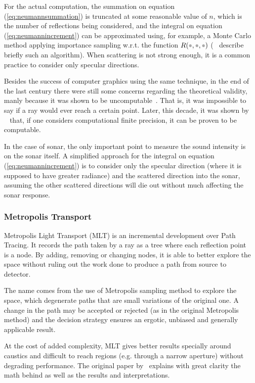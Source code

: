 For the actual computation, the summation on equation (\ref{eq:neumannsummation})
is truncated at some reasonable value of $n$, which is the number of
reflections being considered, and the integral on equation
(\ref{eq:neumannincrement}) can be approximated using, for example, a Monte Carlo
method applying importance sampling w.r.t. the function $R(\parm,\parm,\parm)$
(~\citet{munjal2013formulas} describe briefly such an algorithm).
When scattering is not strong enough, it is a common practice to consider only
specular directions. 

Besides the success of computer graphics using the same technique, in the end of
the last century there were still some concerns regarding the theoretical
validity, manly because it was shown to be
uncomputable~\cite{reif1994computability}. That is, it was impossible to say if
a ray would ever reach a certain point. Later, this decade, it was shown by
~\citet{blakey2014ray} that, if one considers computational finite precision, it
can be proven to be computable.

In the case of sonar, the only important point to measure the sound intensity is
on the sonar itself. A simplified approach for the integral on equation
(\ref{eq:neumannincrement}) is to consider only the specular direction (where it
is supposed to have greater radiance) and the scattered direction into the
sonar, assuming the other scattered directions will die out without much
affecting the sonar response.


\subsubsection{Metropolis Transport}

Metropolis Light Transport (MLT) is an
incremental development over Path Tracing.
It records the path taken by a ray as a tree where each reflection point is a node. By
adding, removing or changing nodes, it is able to better explore the space
without ruling out the work done to produce a path from source to detector.

The name comes from the use of Metropolis sampling method to explore the space,
which degenerate paths that are small variations of the original one. A change
in the path may be accepted or rejected (as in the original Metropolis method)
and the decision strategy ensures an ergotic, unbiased and generally applicable
result.

At the cost of added complexity, MLT gives better results specially around
caustics and difficult to reach regions (e.g. through a narrow aperture)
without degrading performance. The original paper by~\citet{veach1997metropolis}
explains with great clarity the math behind as well as the results and
interpretations.


